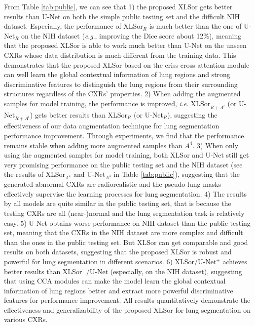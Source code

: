 \documentclass{midl} \usepackage{multirow}
\newcommand{\ie}{\textit{i}.\textit{e}. }
\newcommand{\eg}{\textit{e}.\textit{g}., }
\begin{document}
From Table \ref{tab:public}, we can see that 1) the proposed XLSor gets better results than U-Net on both the simple public testing set and the difficult NIH dataset. Especially, the performance of XLSor$_{R}$ is much better than the one of U-Net$_{R}$ on the NIH dataset (\eg improving the Dice score about 12\%), meaning that the proposed XLSor is able to work much better than U-Net on the unseen CXRs whose data distribution is much different from the training data. This demonstrates that the proposed XLSor based on the criss-cross attention module can well learn the global contextual information of lung regions and strong discriminative features to distinguish the lung regions from their surrounding structures regardless of the CXRs' properties. 2) When adding the augmented samples for model training, the performance is improved, \ie XLSor$_{R+A^i}$ (or U-Net$_{R+A^i}$) gets better results than XLSor$_{R}$ (or U-Net$_{R}$), suggesting the effectiveness of our data augmentation technique for lung segmentation performance improvement. Through experiments, we find that the performance remains stable when adding more augmented samples than $A^4$. 3) When only using the augmented samples for model training, both XLSor and U-Net still get very promising performance on the public testing set and the NIH dataset (see the results of XLSor$_{A^4}$ and U-Net$_{A^4}$ in Table \ref{tab:public}), suggesting that the generated abnormal CXRs are radiorealistic and the pseudo lung masks effectively supervise the learning processes for lung segmentation. 4) The results by all models are quite similar in the public testing set, that is because the testing CXRs are all (near-)normal and the lung segmentation task is relatively easy. 5) U-Net obtains worse performance on NIH dataset than the public testing set, meaning that the CXRs in the NIH dataset are more complex and difficult than the ones in the public testing set. But XLSor can get comparable and good results on both datasets, suggesting that the proposed XLSor is robust and powerful for lung segmentation in different scenarios. 6) XLSor/U-Net$^+$ achieves better results than XLSor$^-$/U-Net (especially, on the NIH dataset), suggesting that using CCA modules can make the model learn the global contextual information of lung regions better and extract more powerful discriminative features for performance improvement. All results quantitatively demonstrate the effectiveness and generalizability of the proposed XLSor for lung segmentation on various CXRs.
\end{document}
